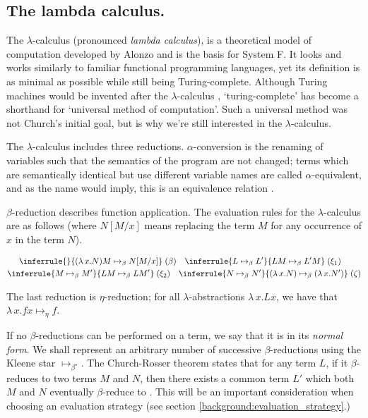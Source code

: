 \subsection{The lambda calculus.}
The $\lambda$-calculus (pronounced \textit{lambda calculus}), is a theoretical model of computation
developed by Alonzo \citet{church_set_1932} and is the basis for System F. It
looks and works similarly to familiar functional programming languages, yet its definition is as
minimal as possible while still being Turing-complete. Although Turing machines would be invented
after the $\lambda$-calculus \citep{turing_computable_1937}, `turing-complete' has become a
shorthand for `universal method of computation'. Such a universal method was not Church's initial
goal, but is why we're still interested in the $\lambda$-calculus.

The $\lambda$-calculus includes three reductions. $\alpha$-conversion is the renaming of variables
such that the semantics of the program are not changed; terms which are semantically identical but
use different variable names are called $\alpha$-equivalent, and as the name would imply, this is an
equivalence relation \citep{pierce_types_2002}.

$\beta$-reduction describes function application. The evaluation rules for the $\lambda$-calculus
are as follows \citep{wadler_programming_2022} (where $N[M/x]$ means replacing the term $M$ for any occurrence of $x$ in the term $N$).

\begin{equation}
\label{equation:untyped_beta_rules}
\begin{gathered}
  \inferrule{ }{(\lambda \, x. N)M \mapsto_{\beta} N[M/x]} \; (\beta) \quad
  \inferrule{L \mapsto_{\beta} L'}{LM \mapsto_{\beta} L'M} \; (\xi_1) \quad\\
  \inferrule{M \mapsto_{\beta} M'}{LM \mapsto_{\beta} LM'} \; (\xi_2) \quad
  \inferrule
    {N \mapsto_{\beta} N'}
    {(\lambda \, x. N) \mapsto_{\beta} (\lambda \, x. N')} \; (\zeta)
\end{gathered}
\end{equation}

The last reduction is $\eta$-reduction; for all $\lambda$-abstractions $\lambda \, x. L x$, we have
that $\lambda \, x. f x \mapsto_{\eta} f$.

If no $\beta$-reductions can be performed on a term, we say that it is in its \textit{normal form}.
We shall represent an arbitrary number of successive $\beta$-reductions using the Kleene star
$\mapsto_{\beta^{\star}}$. The Church-Rosser theorem states that for any term $L$, if it
$\beta$-reduces to two terms $M$ and $N$, then there exists a common term $L'$ which both $M$ and
$N$ eventually $\beta$-reduce to \citep{church_properties_1936}. This will be an important
consideration when choosing an evaluation strategy (see section
\ref{background:evaluation_strategy}.)

